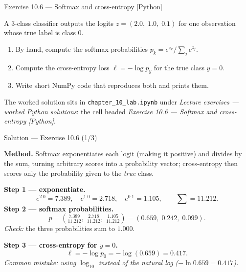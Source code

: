 \documentclass[aspectratio=169,11pt]{beamer}
\begin{document}
\begin{frame}[fragile]{Exercise 10.6 --- Softmax and cross-entropy [Python]}
\begin{exercise}
  A 3-class classifier outputs the logits
  $z = (2.0,\; 1.0,\; 0.1)$ for one observation whose true label is
  class $0$.
  \begin{enumerate}
    \item By hand, compute the softmax probabilities
          $p_k = e^{z_k} / \sum_j e^{z_j}$.
    \item Compute the cross-entropy loss
          $\ell = -\log p_{y}$ for the true class $y = 0$.
    \item Write short NumPy code that reproduces both and prints them.
  \end{enumerate}
\end{exercise}
\begin{labnote}
  The worked solution sits in \texttt{chapter\_10\_lab.ipynb} under
  \emph{Lecture exercises --- worked Python solutions}: the cell headed
  \emph{Exercise 10.6 --- Softmax and cross-entropy [Python]}.
\end{labnote}
\end{frame}

\begin{frame}{Solution --- Exercise 10.6 (1/3)}
\begin{solutionbox}
  \textbf{Method.} Softmax exponentiates each logit (making it positive) and
  divides by the sum, turning arbitrary scores into a probability vector;
  cross-entropy then scores only the probability given to the \emph{true} class.

  \smallskip
  \textbf{Step 1 --- exponentiate.}
  \[
    e^{2.0} = 7.389,\quad e^{1.0} = 2.718,\quad e^{0.1} = 1.105,
    \qquad \textstyle\sum = 11.212 .
  \]
  \textbf{Step 2 --- softmax probabilities.}
  \[
    p = \left(\tfrac{7.389}{11.212},\; \tfrac{2.718}{11.212},\;
              \tfrac{1.105}{11.212}\right)
      = (0.659,\; 0.242,\; 0.099).
  \]
  \emph{Check:} the three probabilities sum to $1.000$.

  \smallskip
  \textbf{Step 3 --- cross-entropy for $y = 0$.}
  \[
    \ell = -\log p_0 = -\log(0.659) = 0.417 .
  \]
  \textit{Common mistake: using $\log_{10}$ instead of the natural log ($-\ln 0.659 = 0.417$).}
\end{solutionbox}
\end{frame}
\end{document}
